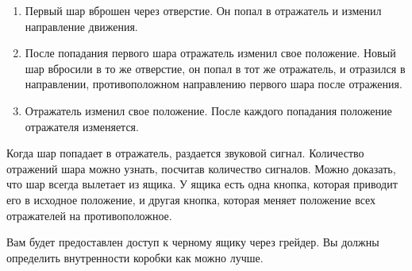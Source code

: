 \begin{enumerate}
\item Первый шар вброшен через отверстие. Он попал в отражатель и изменил направление движения.
\item После попадания первого шара отражатель изменил свое положение. Новый шар вбросили в то же отверстие, он попал в тот же отражатель, и отразился в направлении, противоположном направлению первого шара после отражения.
\item Отражатель изменил свое положение. После каждого попадания положение отражателя изменяется.
\end{enumerate}

Когда шар попадает в отражатель, раздается звуковой сигнал. Количество отражений шара можно узнать, посчитав количество сигналов. Можно доказать, что шар всегда вылетает из ящика. У ящика есть одна кнопка, которая приводит его в исходное положение, и другая кнопка, которая меняет положение всех отражателей на противоположное.

Вам будет предоставлен доступ к черному ящику через грейдер. Вы должны определить внутренности коробки как можно лучше.